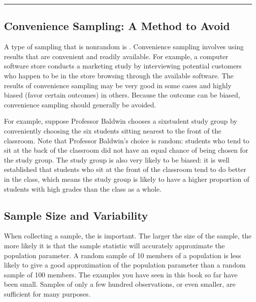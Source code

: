 \documentclass[letterpaper,10pt,english]{jupyterBook}
\begin{document}
\bigskip\hrule\bigskip



\subsection{Convenience Sampling: A Method to Avoid}
\label{\detokenize{Ch1 Sampling and Data/1.3 Sampling Techniques:convenience-sampling-a-method-to-avoid}}
\sphinxAtStartPar
A type of sampling that is non\sphinxhyphen{}random is . Convenience sampling involves using results that are convenient and readily available. For example, a computer software store conducts a marketing study by interviewing potential customers who happen to be in the store browsing through the available software. The results of convenience sampling may be very good in some cases and highly biased (favor certain outcomes) in others. Because the outcome can be biased, convenience sampling should generally be avoided.

\sphinxAtStartPar
For example, suppose Professor Baldwin chooses a six\sphinxhyphen{}student study group by conveniently choosing the six students sitting nearest to the front of the classroom. Note that Professor Baldwin’s choice is  random: students who tend to sit at the back of the classroom did not have an equal chance of being chosen for the study group. The study group is also very likely to be biased: it is well established that students who sit at the front of the classroom tend to do better in the class, which means the study group is likely to have a higher proportion of students with high grades than the class as a whole.


\subsection{Sample Size and Variability}
\label{\detokenize{Ch1 Sampling and Data/1.3 Sampling Techniques:sample-size-and-variability}}
\sphinxAtStartPar
When collecting a sample, the  is important. The larger the size of the sample, the more likely it is that the sample statistic will accurately approximate the population parameter. A random sample of 10 members of a population is less likely to give a good approximation of the population parameter than a random sample of 100 members. The examples you have seen in this book so far have been small. Samples of only a few hundred observations, or even smaller, are sufficient for many purposes.
\end{document}
